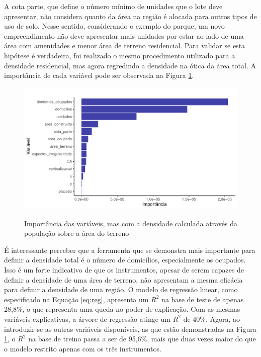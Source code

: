 A cota parte, que define o número mínimo de unidades que o lote deve apresentar, não considera quanto da área na região é alocada para outros tipos de uso de solo. Nesse sentido, considerando o exemplo do parque, um novo empreendimento não deve apresentar mais unidades por estar ao lado de uma área com amenidades e menor área de terreno residencial. Para validar se esta hipótese é verdadeira, foi realizado o mesmo procedimento utilizado para a densidade residencial, mas agora regredindo a densidade na ótica da área total. A importância de cada variável pode ser observada na Figura \ref{fig:importancia_densmod}.

\begin{figure}[h]
    \centering
    \caption{Importância das variáveis, mas com a densidade calculada através da população sobre a área do terreno}
    \includegraphics[width = .95\linewidth]{imagens/var_importance_densmod.pdf}
    \label{fig:importancia_densmod}
\end{figure}

É interessante perceber que a ferramenta que se demonstra mais importante para definir a densidade total é o número de domicílios, especialmente os ocupados. Isso é um forte indicativo de que os instrumentos, apesar de serem capazes de definir a densidade de uma área de terreno, não apresentam a mesma eficácia para definir a densidade de uma região. O modelo de regressão linear, como especificado na Equação \ref{eq:reg}, apresenta um $R^2$ na base de teste de apenas 28,8\%, o que representa uma queda no poder de explicação. Com as mesmas variáveis explicativas, a árvore de regressão atinge um $R^2$ de 40\%. Agora, ao introduzir-se as outras variáveis disponíveis, as que estão demonstradas na Figura \ref{fig:importancia_densmod}, o $R^2$ na base de treino passa a ser de 95,6\%, mais que duas vezes maior do que o modelo restrito apenas com os três instrumentos. 

